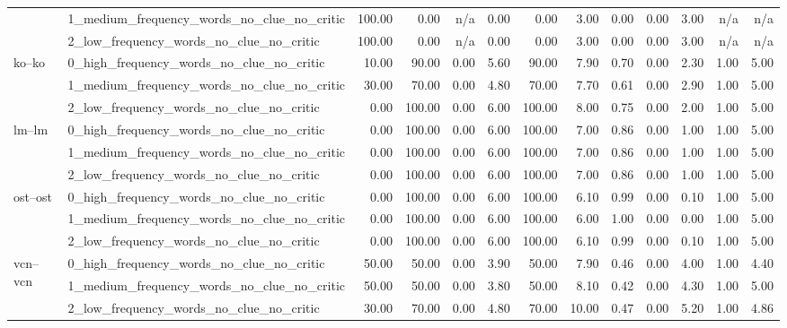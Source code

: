 \begin{tabular}{llrrrrrrrrrrr}
 & 1_medium_frequency_words_no_clue_no_critic & 100.00 & 0.00 & n/a & 0.00 & 0.00 & 3.00 & 0.00 & 0.00 & 3.00 & n/a & n/a \\
 & 2_low_frequency_words_no_clue_no_critic & 100.00 & 0.00 & n/a & 0.00 & 0.00 & 3.00 & 0.00 & 0.00 & 3.00 & n/a & n/a \\
\cline{1-13}
\multirow[t]{3}{*}{ko--ko} & 0_high_frequency_words_no_clue_no_critic & 10.00 & 90.00 & 0.00 & 5.60 & 90.00 & 7.90 & 0.70 & 0.00 & 2.30 & 1.00 & 5.00 \\
 & 1_medium_frequency_words_no_clue_no_critic & 30.00 & 70.00 & 0.00 & 4.80 & 70.00 & 7.70 & 0.61 & 0.00 & 2.90 & 1.00 & 5.00 \\
 & 2_low_frequency_words_no_clue_no_critic & 0.00 & 100.00 & 0.00 & 6.00 & 100.00 & 8.00 & 0.75 & 0.00 & 2.00 & 1.00 & 5.00 \\
\cline{1-13}
\multirow[t]{3}{*}{lm--lm} & 0_high_frequency_words_no_clue_no_critic & 0.00 & 100.00 & 0.00 & 6.00 & 100.00 & 7.00 & 0.86 & 0.00 & 1.00 & 1.00 & 5.00 \\
 & 1_medium_frequency_words_no_clue_no_critic & 0.00 & 100.00 & 0.00 & 6.00 & 100.00 & 7.00 & 0.86 & 0.00 & 1.00 & 1.00 & 5.00 \\
 & 2_low_frequency_words_no_clue_no_critic & 0.00 & 100.00 & 0.00 & 6.00 & 100.00 & 7.00 & 0.86 & 0.00 & 1.00 & 1.00 & 5.00 \\
\cline{1-13}
\multirow[t]{3}{*}{ost--ost} & 0_high_frequency_words_no_clue_no_critic & 0.00 & 100.00 & 0.00 & 6.00 & 100.00 & 6.10 & 0.99 & 0.00 & 0.10 & 1.00 & 5.00 \\
 & 1_medium_frequency_words_no_clue_no_critic & 0.00 & 100.00 & 0.00 & 6.00 & 100.00 & 6.00 & 1.00 & 0.00 & 0.00 & 1.00 & 5.00 \\
 & 2_low_frequency_words_no_clue_no_critic & 0.00 & 100.00 & 0.00 & 6.00 & 100.00 & 6.10 & 0.99 & 0.00 & 0.10 & 1.00 & 5.00 \\
\cline{1-13}
\multirow[t]{3}{*}{vcn--vcn} & 0_high_frequency_words_no_clue_no_critic & 50.00 & 50.00 & 0.00 & 3.90 & 50.00 & 7.90 & 0.46 & 0.00 & 4.00 & 1.00 & 4.40 \\
 & 1_medium_frequency_words_no_clue_no_critic & 50.00 & 50.00 & 0.00 & 3.80 & 50.00 & 8.10 & 0.42 & 0.00 & 4.30 & 1.00 & 5.00 \\
 & 2_low_frequency_words_no_clue_no_critic & 30.00 & 70.00 & 0.00 & 4.80 & 70.00 & 10.00 & 0.47 & 0.00 & 5.20 & 1.00 & 4.86 \\
\cline{1-13}
\bottomrule
\end{tabular}
